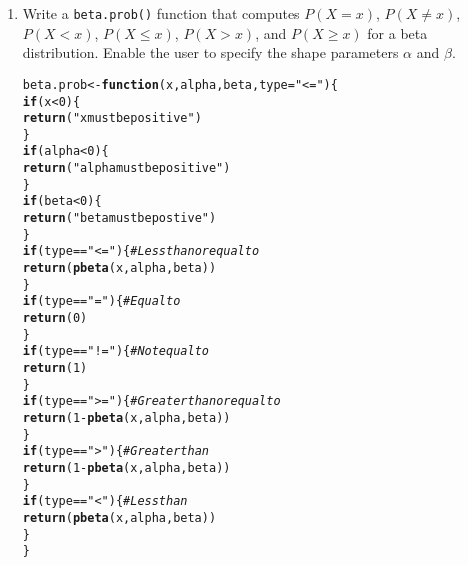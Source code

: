 \documentclass{article}\usepackage[]{graphicx}\usepackage[]{xcolor}
\makeatletter
\newcommand{\hlnum}[1]{\textcolor[rgb]{0.686,0.059,0.569}{#1}}%
\newcommand{\hlsng}[1]{\textcolor[rgb]{0.192,0.494,0.8}{#1}}%
\newcommand{\hlcom}[1]{\textcolor[rgb]{0.678,0.584,0.686}{\textit{#1}}}%
\newcommand{\hlopt}[1]{\textcolor[rgb]{0,0,0}{#1}}%
\newcommand{\hldef}[1]{\textcolor[rgb]{0.345,0.345,0.345}{#1}}%
\newcommand{\hlkwa}[1]{\textcolor[rgb]{0.161,0.373,0.58}{\textbf{#1}}}%
\newcommand{\hlkwb}[1]{\textcolor[rgb]{0.69,0.353,0.396}{#1}}%
\newcommand{\hlkwc}[1]{\textcolor[rgb]{0.333,0.667,0.333}{#1}}%
\newcommand{\hlkwd}[1]{\textcolor[rgb]{0.737,0.353,0.396}{\textbf{#1}}}%
\newenvironment{kframe}{%
 \def\at@end@of@kframe{}%
 \ifinner\ifhmode%
  \def\at@end@of@kframe{\end{minipage}}%
  \begin{minipage}{\columnwidth}%
 \fi\fi%
 \def\FrameCommand##1{\hskip\@totalleftmargin \hskip-\fboxsep
 \colorbox{shadecolor}{##1}\hskip-\fboxsep
     \hskip-\linewidth \hskip-\@totalleftmargin \hskip\columnwidth}%
 \MakeFramed {\advance\hsize-\width
   \@totalleftmargin\z@ \linewidth\hsize
   \@setminipage}}%
 {\par\unskip\endMakeFramed%
 \at@end@of@kframe}
\newenvironment{knitrout}{}{} %
\makeatother
\begin{document}
\begin{enumerate}
\begin{knitrout}
\begin{kframe}
\begin{alltt}
  \hldef{\}}
\end{alltt}
\end{kframe}
\end{knitrout}
    \item Write a \texttt{beta.prob()} function that computes $P(X=x)$, 
    $P(X \neq x)$, $P(X<x)$, $P(X \leq x)$, $P(X > x)$, and $P(X \geq x)$
    for a beta distribution. Enable the user to specify the shape parameters
    $\alpha$ and $\beta$.
\begin{knitrout}\scriptsize
{}\color{fgcolor}\begin{kframe}
\begin{alltt}
\hldef{beta.prob} \hlkwb{<-} \hlkwa{function}\hldef{(}\hlkwc{x}\hldef{,} \hlkwc{alpha}\hldef{,} \hlkwc{beta}\hldef{,} \hlkwc{type}\hldef{=}\hlsng{"<="}\hldef{)\{}
  \hlkwa{if}\hldef{(x}\hlopt{<}\hlnum{0}\hldef{)\{}
    \hlkwd{return}\hldef{(}\hlsng{"x must be positive"}\hldef{)}
  \hldef{\}}
  \hlkwa{if}\hldef{(alpha}\hlopt{<}\hlnum{0}\hldef{)\{}
    \hlkwd{return}\hldef{(}\hlsng{"alpha must be positive"}\hldef{)}
  \hldef{\}}
  \hlkwa{if}\hldef{(beta}\hlopt{<}\hlnum{0}\hldef{)\{}
    \hlkwd{return}\hldef{(}\hlsng{"beta must be postive"}\hldef{)}
  \hldef{\}}
  \hlkwa{if}\hldef{(type} \hlopt{==} \hlsng{"<="}\hldef{)\{}\hlcom{#Less than or equal to}
    \hlkwd{return}\hldef{(}\hlkwd{pbeta}\hldef{(x,alpha,beta))}
  \hldef{\}}
  \hlkwa{if}\hldef{(type} \hlopt{==} \hlsng{"="}\hldef{)\{}\hlcom{#Equal to}
    \hlkwd{return}\hldef{(}\hlnum{0}\hldef{)}
  \hldef{\}}
  \hlkwa{if}\hldef{(type} \hlopt{==} \hlsng{"!="}\hldef{)\{}\hlcom{#Not equal to}
    \hlkwd{return}\hldef{(}\hlnum{1}\hldef{)}
  \hldef{\}}
  \hlkwa{if}\hldef{(type} \hlopt{==} \hlsng{">="}\hldef{)\{}\hlcom{# Greater than or equal to}
    \hlkwd{return}\hldef{(}\hlnum{1}\hlopt{-}\hlkwd{pbeta}\hldef{(x,alpha,beta))}
    \hldef{\}}
  \hlkwa{if}\hldef{(type} \hlopt{==} \hlsng{">"}\hldef{)\{}\hlcom{# Greater than}
    \hlkwd{return}\hldef{(}\hlnum{1}\hlopt{-}\hlkwd{pbeta}\hldef{(x,alpha,beta))}
  \hldef{\}}
  \hlkwa{if}\hldef{(type} \hlopt{==} \hlsng{"<"}\hldef{)\{}\hlcom{#Less than}
    \hlkwd{return}\hldef{(}\hlkwd{pbeta}\hldef{(x,alpha,beta))}
  \hldef{\}}
\hldef{\}}
\end{alltt}
\end{kframe}
\end{knitrout}
\end{enumerate}

\end{document}
